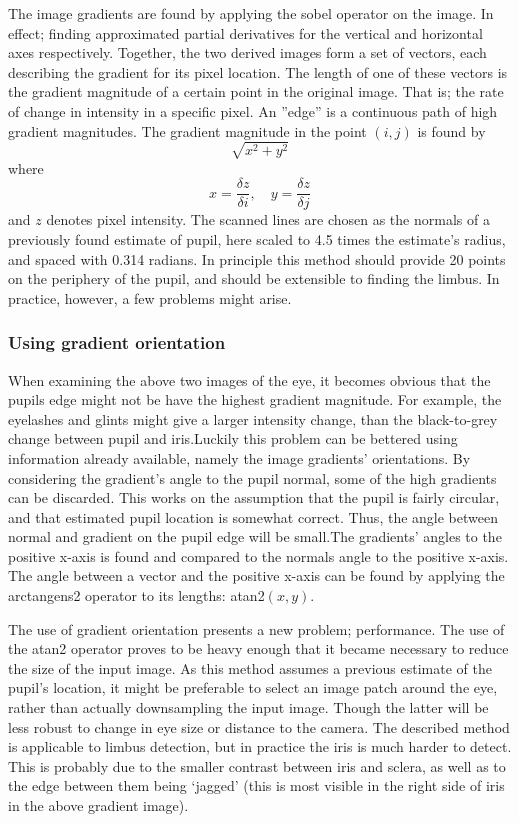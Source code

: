 The image gradients are found by applying the sobel operator on the image. In
effect; finding approximated partial derivatives for the vertical and
horizontal axes respectively. Together, the two derived images form a set of
vectors, each describing the gradient for its pixel location. The length of one
of these vectors is the gradient magnitude of a certain point in the original
image. That is; the rate of change in intensity in a specific pixel. An
''edge'' is a continuous path of high gradient magnitudes. The gradient
magnitude in the point $(i,j)$ is found by $$\sqrt{x^2+y^2}$$ where $$x =
\frac{\delta z}{\delta i}, \quad y = \frac{\delta z}{\delta j}$$ and $z$
denotes pixel intensity. The scanned lines are chosen as the normals of a
previously found estimate of pupil, here scaled to 4.5 times the estimate’s
radius, and spaced with 0.314 radians. In principle this method should provide
20 points on the periphery of the pupil, and should be extensible to finding
the limbus. In practice, however, a few problems might arise.

\subsubsection{Using gradient orientation}
When examining the above two images of the eye, it becomes obvious that the
pupils edge might not be have the highest gradient magnitude. For example, the
eyelashes and glints might give a larger intensity change, than the
black-to-grey change between pupil and iris.Luckily this problem can be
bettered using information already available, namely the image gradients’
orientations. By considering the gradient’s angle to the pupil normal, some of
the high gradients can be discarded. This works on the assumption that the
pupil is fairly circular, and that estimated pupil location is somewhat
correct. Thus, the angle between normal and gradient on the pupil edge will be
small.The gradients’ angles to the positive x-axis is found and compared to the
normals angle to the positive x-axis. The angle between a vector and the
positive x-axis can be found by applying the arctangens2 operator to its
lengths: atan2$(x,y)$.

The use of gradient orientation presents a new problem; performance. The use of
the atan2 operator proves to be heavy enough that it became necessary to reduce
the size of the input image. As this method assumes a previous estimate of the
pupil’s location, it might be preferable to select an image patch around the
eye, rather than actually downsampling the input image. Though the latter will
be less robust to change in eye size or distance to the camera. The described
method is applicable to limbus detection, but in practice the iris is much
harder to detect. This is probably due to the smaller contrast between iris and
sclera, as well as to the edge between them being ‘jagged’ (this is most
visible in the right side of iris in the above gradient image).


